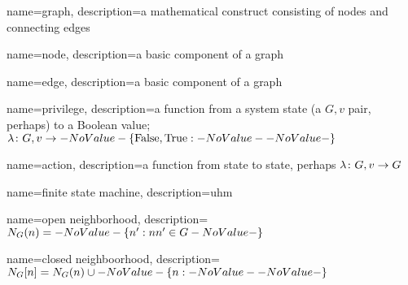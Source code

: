 
{
  name=graph,
  description={a mathematical construct consisting of nodes and connecting edges}
}

{
  name=node,
  description={a basic component of a graph}
}

{
  name=edge,
  description={a basic component of a graph}
}

{
  name=privilege,
  description={a function from a system state (a $G, v$ pair, perhaps) to a Boolean value; $\Function{G, v}{\Set{\text{False}, \text{True}}}$}
}

{
  name=action,
  description={a function from state to state, perhaps $\Function{G, v}{G}$}
}

{
  name=finite state machine,
  description={uhm}
}

{
  name=open neighborhood,
  description={$\OpenNeighborhood{n}[G] = \Set{n^\prime}[nn^\prime \in G]$}
}

{
  name=closed neighboorhood,
  description={$\ClosedNeighborhood{n}[G] = \OpenNeighborhood{n}[G] \cup \Set{n}$}
}


